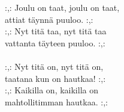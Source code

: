
:,: Joulu on taat, joulu on taat, \\ attiat täynnä puuloo. :,: \\ :,: Nyt titä taa, nyt titä taa \\ vattanta täyteen puuloo. :,: \\ \hspace{10mm} \\ :,: Nyt titä on, nyt titä on, \\ taatana kun on hautkaa! :,: \\ :,: Kaikilla on, kaikilla on \\ mahtollitimman hautkaa. :,: